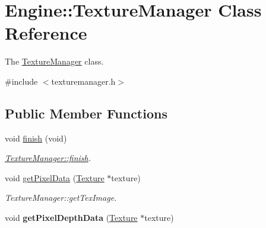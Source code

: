 \hypertarget{classEngine_1_1TextureManager}{}\section{Engine\+:\+:Texture\+Manager Class Reference}
\label{classEngine_1_1TextureManager}


The \hyperlink{classEngine_1_1TextureManager}{Texture\+Manager} class.  




{\ttfamily \#include $<$texturemanager.\+h$>$}

\subsection*{Public Member Functions}
\begin{DoxyCompactItemize}
\item 
void \hyperlink{classEngine_1_1TextureManager_aa68378b5b12bd19c721f56d9e9a9ccab}{finish} (void)
\begin{DoxyCompactList}\small\item\em \hyperlink{classEngine_1_1TextureManager_aa68378b5b12bd19c721f56d9e9a9ccab}{Texture\+Manager\+::finish}. \end{DoxyCompactList}\item 
void \hyperlink{classEngine_1_1TextureManager_a48d5c9b6613be6bd97bce4d5eb2078c4}{get\+Pixel\+Data} (\hyperlink{classEngine_1_1Texture}{Texture} $\ast$texture)
\begin{DoxyCompactList}\small\item\em Texture\+Manager\+::get\+Tex\+Image. \end{DoxyCompactList}\item 
\hypertarget{classEngine_1_1TextureManager_a4de63cf80197ed191633ea88ae5aee51}{}void {\bfseries get\+Pixel\+Depth\+Data} (\hyperlink{classEngine_1_1Texture}{Texture} $\ast$texture)\label{classEngine_1_1TextureManager_a4de63cf80197ed191633ea88ae5aee51}


\end{DoxyCompactItemize}
